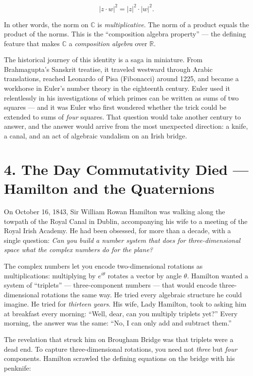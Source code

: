 \[|z \cdot w|^2 = |z|^2 \cdot |w|^2.\]

In other words, the norm on \(\mathbb{C}\) is \emph{multiplicative}. The norm of a product equals the product of the norms. This is the ``composition algebra property'' --- the defining feature that makes \(\mathbb{C}\) a \emph{composition algebra} over \(\mathbb{R}\).

The historical journey of this identity is a saga in miniature. From Brahmagupta's Sanskrit treatise, it traveled westward through Arabic translations, reached Leonardo of Pisa (Fibonacci) around 1225, and became a workhorse in Euler's number theory in the eighteenth century. Euler used it relentlessly in his investigations of which primes can be written as sums of two squares --- and it was Euler who first wondered whether the trick could be extended to sums of \emph{four} squares. That question would take another century to answer, and the answer would arrive from the most unexpected direction: a knife, a canal, and an act of algebraic vandalism on an Irish bridge.



\section{4. The Day Commutativity Died --- Hamilton and the Quaternions}\label{ch9-the-day-commutativity-died-hamilton-and-the-quaternions}

On October 16, 1843, Sir William Rowan Hamilton was walking along the towpath of the Royal Canal in Dublin, accompanying his wife to a meeting of the Royal Irish Academy. He had been obsessed, for more than a decade, with a single question: \emph{Can you build a number system that does for three-dimensional space what the complex numbers do for the plane?}

The complex numbers let you encode two-dimensional rotations as multiplications: multiplying by \(e^{i\theta}\) rotates a vector by angle \(\theta\). Hamilton wanted a system of ``triplets'' --- three-component numbers --- that would encode three-dimensional rotations the same way. He tried every algebraic structure he could imagine. He tried for \emph{thirteen years}. His wife, Lady Hamilton, took to asking him at breakfast every morning: ``Well, dear, can you multiply triplets yet?'' Every morning, the answer was the same: ``No, I can only add and subtract them.''

The revelation that struck him on Brougham Bridge was that triplets were a dead end. To capture three-dimensional rotations, you need not \emph{three} but \emph{four} components. Hamilton scrawled the defining equations on the bridge with his penknife:

